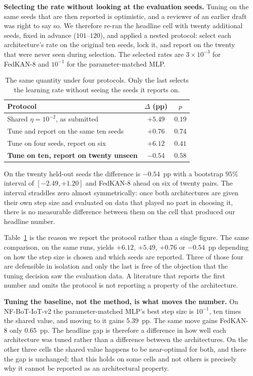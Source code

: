 \textbf{Selecting the rate without looking at the evaluation seeds.} Tuning on the same seeds
that are then reported is optimistic, and a reviewer of an earlier draft was right to say so. We
therefore re-ran the headline cell with twenty additional seeds, fixed in advance
($101$--$120$), and applied a nested protocol: select each architecture's rate on the original
ten seeds, lock it, and report on the twenty that were never seen during selection. The selected
rates are $3\times10^{-3}$ for FedKAN-8 and $10^{-1}$ for the parameter-matched MLP.

\begin{table}[t]
\caption{The same quantity under four protocols. Only the last selects the learning rate
without seeing the seeds it reports on.}
\label{tab:protocols}
\centering
\footnotesize
\begin{tabular}{@{}lcc@{}}
\toprule
Protocol & $\Delta$ (pp) & $p$ \\
\midrule
Shared $\eta=10^{-2}$, as submitted            & $+5.49$ & $0.19$ \\
Tune and report on the same ten seeds          & $+0.76$ & $0.74$ \\
Tune on four seeds, report on six              & $+6.12$ & $0.41$ \\
\textbf{Tune on ten, report on twenty unseen}  & $\mathbf{-0.54}$ & $\mathbf{0.58}$ \\
\bottomrule
\end{tabular}
\end{table}

On the twenty held-out seeds the difference is $-0.54$~pp with a bootstrap $95\%$ interval of
$[-2.49,+1.20]$ and FedKAN-8 ahead on six of twenty pairs. The interval straddles zero almost
symmetrically: once both architectures are given their own step size and evaluated on data that
played no part in choosing it, there is no measurable difference between them on the cell that
produced our headline number.

Table~\ref{tab:protocols} is the reason we report the protocol rather than a single figure. The
same comparison, on the same runs, yields $+6.12$, $+5.49$, $+0.76$ or $-0.54$~pp depending on
how the step size is chosen and which seeds are reported. Three of those four are defensible in
isolation and only the last is free of the objection that the tuning decision saw the evaluation
data. A literature that reports the first number and omits the protocol is not reporting a
property of the architecture.

\textbf{Tuning the baseline, not the method, is what moves the number.} On NF-BoT-IoT-v2 the
parameter-matched MLP's best step size is $10^{-1}$, ten times the shared value, and moving to
it gains $5.39$~pp. The same move gains FedKAN-8 only $0.65$~pp. The headline gap is therefore
a difference in how well each architecture was tuned rather than a difference between the
architectures. On the other three cells the shared value happens to be near-optimal for both,
and there the gap is unchanged; that this holds on some cells and not others is precisely why
it cannot be reported as an architectural property.

